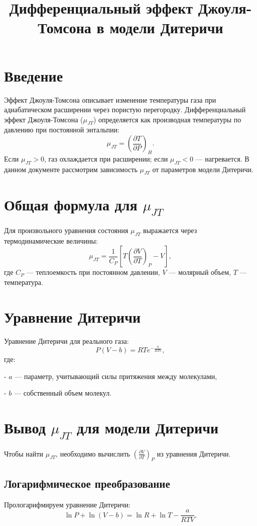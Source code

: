 \documentclass[12pt]{article}
\title{Дифференциальный эффект Джоуля-Томсона в модели Дитеричи}
\date{}
\begin{document}
\maketitle

\tableofcontents
\newpage

\section{Введение}
Эффект Джоуля-Томсона описывает изменение температуры газа при адиабатическом расширении через пористую перегородку. Дифференциальный эффект Джоуля-Томсона ($\mu_{JT}$) определяется как производная температуры по давлению при постоянной энтальпии:
$$
\mu_{JT} = \left(\frac{\partial T}{\partial P}\right)_H.
$$
Если $\mu_{JT} > 0$, газ охлаждается при расширении; если $\mu_{JT} < 0$ — нагревается. В данном документе рассмотрим зависимость $\mu_{JT}$ от параметров модели Дитеричи.

\section{Общая формула для $\mu_{JT}$}
Для произвольного уравнения состояния $\mu_{JT}$ выражается через термодинамические величины:
$$
\mu_{JT} = \frac{1}{C_P} \left[T \left(\frac{\partial V}{\partial T}\right)_P - V\right],
$$
где $C_P$ — теплоемкость при постоянном давлении, $V$ — молярный объем, $T$ — температура.

\section{Уравнение Дитеричи}
Уравнение Дитеричи для реального газа:
$$
P(V - b) = RT e^{-\frac{a}{RTV}},
$$
где:

    
- $a$ — параметр, учитывающий силы притяжения между молекулами,
    
- $b$ — собственный объем молекул.


\section{Вывод $\mu_{JT}$ для модели Дитеричи}
Чтобы найти $\mu_{JT}$, необходимо вычислить $\left(\frac{\partial V}{\partial T}\right)_P$ из уравнения Дитеричи.

\subsection{Логарифмическое преобразование}
Прологарифмируем уравнение Дитеричи:
$$
\ln P + \ln(V - b) = \ln R + \ln T - \frac{a}{RTV}.
$$
\end{document}
